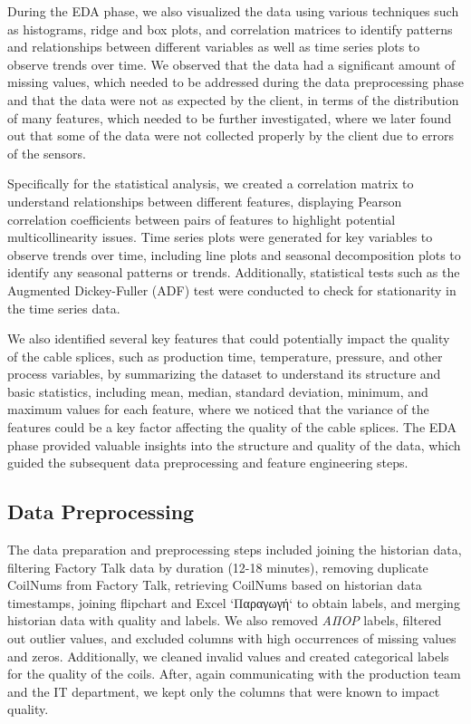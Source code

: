 During the EDA phase, we also visualized the data using various techniques such
as histograms, ridge and box plots, and correlation matrices to identify
patterns and relationships between different variables as well as time series
plots to observe trends over time. We observed that the data had a significant
amount of missing values, which needed to be addressed during the data
preprocessing phase and that the data were not as expected by the client, in
terms of the distribution of many features, which needed to be further
investigated, where we later found out that some of the data were not collected
properly by the client due to errors of the sensors.

Specifically for the statistical analysis, we created a correlation matrix to
understand relationships between different features, displaying Pearson
correlation coefficients between pairs of features to highlight potential
multicollinearity issues. Time series plots were generated for key variables to
observe trends over time, including line plots and seasonal decomposition plots
to identify any seasonal patterns or trends. Additionally, statistical tests
such as the Augmented Dickey-Fuller (ADF) test were conducted to check for
stationarity in the time series data.

We also identified several key features that could potentially impact the
quality of the cable splices, such as production time, temperature, pressure,
and other process variables, by summarizing the dataset to understand its
structure and basic statistics, including mean, median, standard deviation,
minimum, and maximum values for each feature, where we noticed that the
variance of the features could be a key factor affecting the quality of the
cable splices. The EDA phase provided valuable insights into the structure and
quality of the data, which guided the subsequent data preprocessing and feature
engineering steps.

\subsection{Data Preprocessing}

The data preparation and preprocessing steps included joining the historian
data, filtering Factory Talk data by duration (12-18 minutes), removing
duplicate CoilNums from Factory Talk, retrieving CoilNums based on historian
data timestamps, joining flipchart and Excel `Παραγωγή` to obtain labels, and
merging historian data with quality and labels. We also removed \emph{ΑΠΟΡ}
labels, filtered out outlier values, and excluded columns with high occurrences
of missing values and zeros. Additionally, we cleaned invalid values and
created categorical labels for the quality of the coils. After, again
communicating with the production team and the IT department, we kept only the
columns that were known to impact quality.

